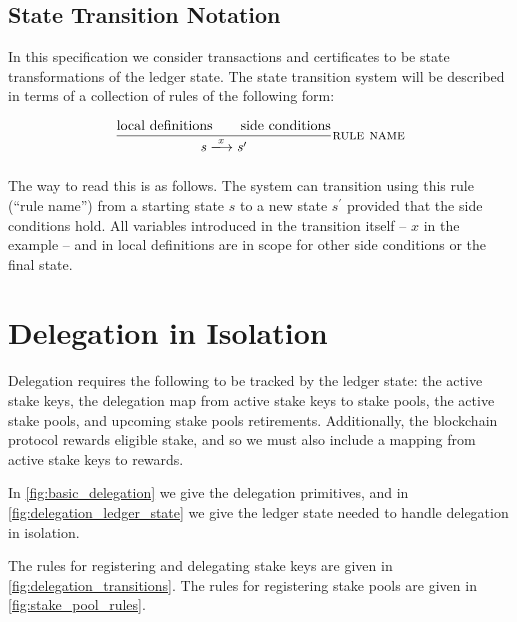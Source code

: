 \documentclass[11pt,a4paper]{article}
\newcommand{\var}[1]{\mathit{#1}}
\newcommand{\transitionarrow}[2]{\xlongrightarrow[\textsc{#1}]{#2}}
\begin{document}
\subsection{State Transition Notation}

In this specification we consider transactions and certificates to be
state transformations of the ledger state.
The state transition system will be described in terms of a collection of
rules of the following form:

%
\begin{equation*}
\frac{
  \text{local definitions} \qquad  \text{side conditions}
}{
  \var{s}
  \transitionarrow{}{\var{x}}
  \var{s}^\prime
}
\textsc{rule name}
\end{equation*}
%

The way to read this is as follows. The system can transition using this rule
(``rule name'') from a starting state $s$ to a new state $s^\prime$ provided
that the side conditions hold. All variables introduced in the transition
itself -- $x$ in the example -- and in local definitions are in scope for
other side conditions or the final state.

\section{Delegation in Isolation}

Delegation requires the following to be tracked by the ledger state:
the active stake keys, the delegation map from active stake keys to stake pools,
the active stake pools, and upcoming stake pools retirements.
Additionally, the blockchain protocol rewards eligible stake, and so we must
also include a mapping from active stake keys to rewards.

In \cref{fig:basic_delegation} we give the delegation primitives, and in
\cref{fig:delegation_ledger_state} we give the ledger state needed to handle
delegation in isolation.

The rules for registering and delegating stake keys are given in \cref{fig:delegation_transitions}.
The rules for registering stake pools are given in \cref{fig:stake_pool_rules}.
\end{document}

